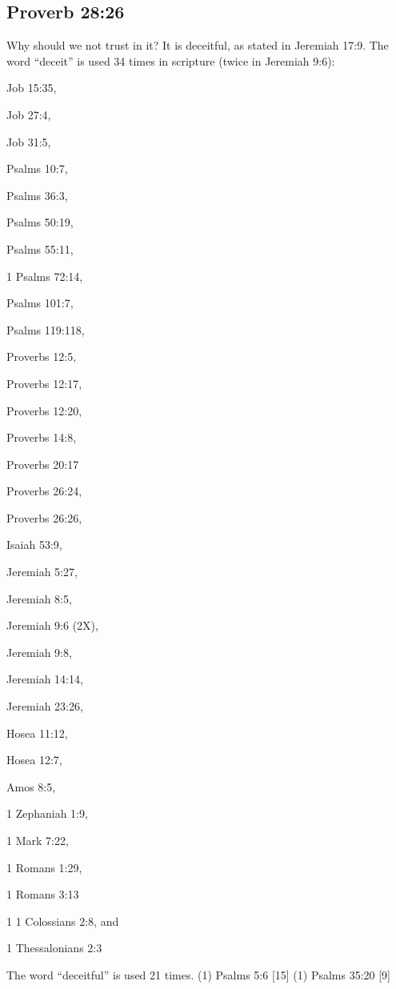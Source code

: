 \subsection{Proverb 28:26}
Why should we not trust in it? It is deceitful, as stated in Jeremiah 17:9. The word ``deceit'' is used 34 times in scripture (twice in Jeremiah 9:6): 
\begin{compactenum}
	\item Job 15:35,
	\item Job 27:4,
 	\item Job 31:5,
 	\item Psalms 10:7,
 	\item Psalms 36:3,
 	\item Psalms 50:19,
 	\item Psalms 55:11, 
	\item 1 Psalms 72:14, 
	\item Psalms 101:7, 
	\item Psalms 119:118, 
	\item Proverbs 12:5, 
	\item Proverbs 12:17, 
	\item Proverbs 12:20, 
	\item Proverbs 14:8, 
	\item Proverbs 20:17 
	\item Proverbs 26:24, 
	\item Proverbs 26:26, 
	\item Isaiah 53:9, 
	\item Jeremiah 5:27, 
	\item Jeremiah 8:5, 
	\item Jeremiah 9:6 (2X), 
	\item Jeremiah 9:8, 
	\item Jeremiah 14:14, 
	\item Jeremiah 23:26, 
	\item Hosea 11:12, 
	\item Hosea 12:7,  
	\item Amos 8:5, 
	\item 1 Zephaniah 1:9,
 	\item 1 Mark 7:22,
	\item 1 Romans 1:29,
	\item 1 Romans 3:13
	\item 1 1 Colossians 2:8, and
 	\item 1 Thessalonians 2:3
\end{compactenum}
The word ``deceitful'' is used 21 times. (1) Psalms 5:6 [15]
(1) Psalms 35:20 [9]
